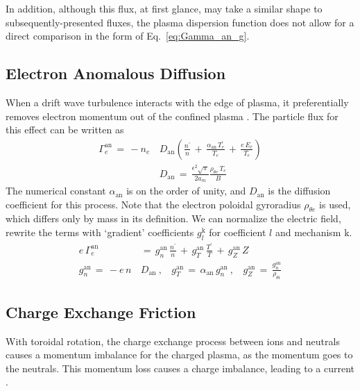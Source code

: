 In addition, although this flux, at first glance, may take a similar shape to subsequently-presented fluxes, the plasma dispersion function does not allow for a direct comparison in the form of Eq.~\ref{eq:Gamma_an_g}.


\subsection{Electron Anomalous Diffusion}\label{ssec:an_diffusion}
When a drift wave turbulence interacts with the edge of plasma, it preferentially removes electron momentum out of the confined plasma \cite{itoh_model_1988} \cite{stringer_non-ambipolar_1995}.
The particle flux for this effect can be written as
\begin{align} %
	\Gamma_e^\text{an} \,=\, -n_e \, &D_\text{an} \left(\frac{n^\prime}{n} \,+\,
		\frac{\alpha_\text{an}\,T_e^\prime}{T_e} \,+\, \frac{e\,E_r}{T_e}\right)
		\label{eq:Gamma_an_orig} \\
	&D_\text{an} \,=\, \frac{\epsilon^2 \sqrt{\pi}}{2 a_m}
		\frac{\rho_{\theta e} \, T_e}{B} \label{eq:D_an}
\end{align}
The numerical constant $\alpha_\text{an}$ is on the order of unity, and $D_\text{an}$ is the diffusion coefficient for this process.
Note that the electron poloidal gyroradius $\rho_{\theta e}$ is used, which differs only by mass in its definition.
We can normalize the electric field, rewrite the terms with `gradient' coefficients $g_l^\text{k}$ for coefficient $l$ and mechanism $\text{k}$.
\begin{align} %
	e\,\Gamma_e^\text{an} \,&=\, g_n^\text{an}\,\frac{n^\prime}{n} \,+\,
		g_T^\text{an}\,\frac{T^\prime}{T} \,+\,
		g_Z^\text{an}\,Z \label{eq:Gamma_an_g} \\
	g_n^\text{an} \,=\, -e \, n \, &D_\text{an}~,~~~~
		g_T^\text{an} \,=\, \alpha_\text{an} \, g_n^\text{an}~,~~~~
		g_Z^\text{an} \,=\, \frac{g_n^\text{an}}{\rho_{\theta i}}
		\label{eq:g_an}
\end{align}


\subsection{Charge Exchange Friction}\label{ssec:cx_friction}
With toroidal rotation, the charge exchange process between ions and neutrals causes a momentum imbalance for the charged plasma, as the momentum goes to the neutrals.
This momentum loss causes a charge imbalance, leading to a current \cite{toda_theoretical_1997}.

